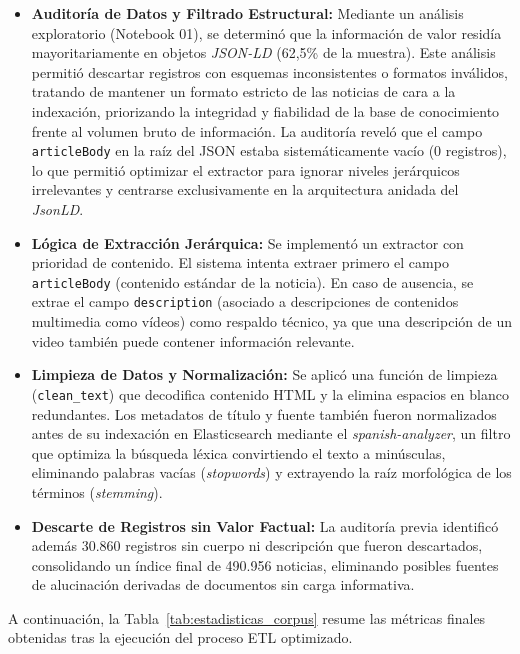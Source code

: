 \begin{itemize}
    \item \textbf{Auditoría de Datos y Filtrado Estructural:} Mediante un análisis exploratorio (Notebook 01), se determinó que la información de valor residía mayoritariamente en objetos \textit{JSON-LD} (62,5\% de la muestra). Este análisis permitió descartar registros con esquemas inconsistentes o formatos inválidos, tratando de mantener un formato estricto de las noticias de cara a la indexación, priorizando la integridad y fiabilidad de la base de conocimiento frente al volumen bruto de información. La auditoría reveló que el campo \texttt{articleBody} en la raíz del JSON estaba sistemáticamente vacío (0 registros), lo que permitió optimizar el extractor para ignorar niveles jerárquicos irrelevantes y centrarse exclusivamente en la arquitectura anidada del \textit{JsonLD}.
    \item \textbf{Lógica de Extracción Jerárquica:} Se implementó un extractor con prioridad de contenido. El sistema intenta extraer primero el campo \texttt{articleBody} (contenido estándar de la noticia). En caso de ausencia, se extrae el campo \texttt{description} (asociado a descripciones de contenidos multimedia como vídeos) como respaldo técnico, ya que una descripción de un video también puede contener información relevante.
    \item \textbf{Limpieza de Datos y Normalización:} Se aplicó una función de limpieza (\texttt{clean\_text}) que decodifica contenido HTML y la elimina espacios en blanco redundantes. Los metadatos de título y fuente también fueron normalizados antes de su indexación en Elasticsearch mediante el \textit{spanish-analyzer}, un filtro que optimiza la búsqueda léxica convirtiendo el texto a minúsculas, eliminando palabras vacías (\textit{stopwords}) y extrayendo la raíz morfológica de los términos (\textit{stemming}).
    \item \textbf{Descarte de Registros sin Valor Factual:} La auditoría previa identificó además 30.860 registros sin cuerpo ni descripción que fueron descartados, consolidando un índice final de 490.956 noticias, eliminando posibles fuentes de alucinación derivadas de documentos sin carga informativa.
\end{itemize}

A continuación, la Tabla~\ref{tab:estadisticas_corpus} resume las métricas finales obtenidas tras la ejecución del proceso ETL optimizado.

